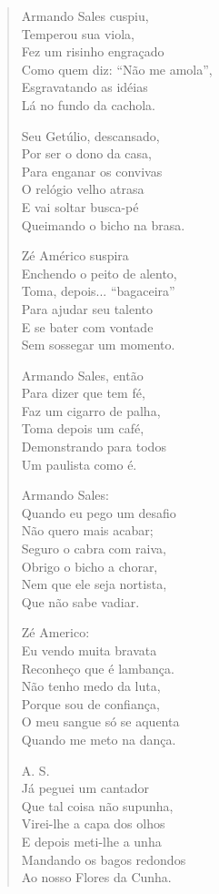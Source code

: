\begin{verse}
Armando Sales cuspiu,\\
Temperou sua viola,\\
Fez um risinho engraçado\\
Como quem diz: “Não me amola”,\\
Esgravatando as idéias\\
Lá no fundo da cachola.
\pagebreak

Seu Getúlio, descansado,\\
Por ser o dono da casa,\\
Para enganar os convivas\\
O relógio velho atrasa\\
E vai soltar busca-pé\\
Queimando o bicho na brasa.

Zé Américo suspira\\
Enchendo o peito de alento,\\
Toma, depois... “bagaceira”\\
Para ajudar seu talento\\
E se bater com vontade \\
Sem sossegar um momento.

Armando Sales, então\\
Para dizer que tem fé,\\
Faz um cigarro de palha,\\
Toma depois um café,\\
Demonstrando para todos\\
Um paulista como é.

Armando Sales:\\
Quando eu pego um desafio\\
Não quero mais acabar;\\
Seguro o cabra com raiva,\\
Obrigo o bicho a chorar,\\
Nem que ele seja nortista,\\
Que não sabe vadiar.
\pagebreak

Zé Americo: \\
Eu vendo muita bravata\\
Reconheço que é lambança.\\
Não tenho medo da luta,\\
Porque sou de confiança,\\
O meu sangue só se aquenta\\
Quando me meto na dança.

A. S.\\
Já peguei um cantador\\
Que tal coisa não supunha,\\
Virei-lhe a capa dos olhos\\
E depois meti-lhe a unha\\
Mandando os bagos redondos\\
Ao nosso Flores da Cunha.


\end{verse}
